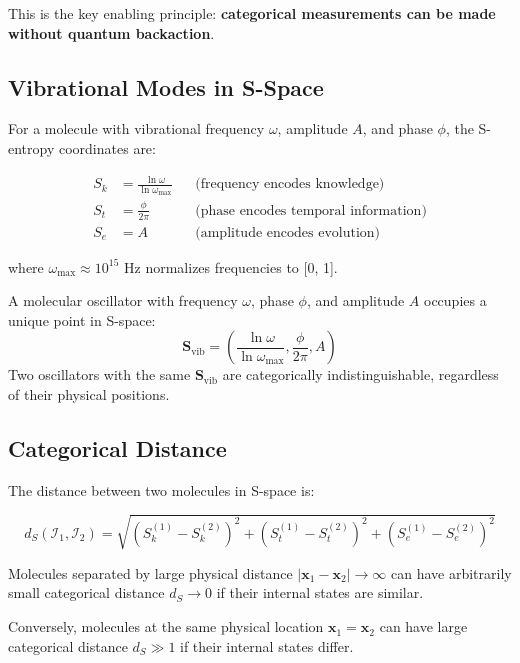 This is the key enabling principle: \textbf{categorical measurements can be made without quantum backaction}.

\subsection{Vibrational Modes in S-Space}

For a molecule with vibrational frequency $\omega$, amplitude $A$, and phase $\phi$, the S-entropy coordinates are:

\begin{align}
S_k &= \frac{\ln \omega}{\ln \omega_{\max}} && \text{(frequency encodes knowledge)} \\
S_t &= \frac{\phi}{2\pi} && \text{(phase encodes temporal information)} \\
S_e &= A && \text{(amplitude encodes evolution)}
\end{align}

where $\omega_{\max} \approx 10^{15}$ Hz normalizes frequencies to [0, 1].

\begin{proposition}
A molecular oscillator with frequency $\omega$, phase $\phi$, and amplitude $A$ occupies a unique point in S-space:
\begin{equation}
\mathbf{S}_{\text{vib}} = \left(\frac{\ln \omega}{\ln \omega_{\max}}, \frac{\phi}{2\pi}, A\right)
\end{equation}
Two oscillators with the same $\mathbf{S}_{\text{vib}}$ are categorically indistinguishable, regardless of their physical positions.
\end{proposition}

\subsection{Categorical Distance}

The distance between two molecules in S-space is:

\begin{equation}
d_S(\mathscr{I}_1, \mathscr{I}_2) = \sqrt{(S_k^{(1)} - S_k^{(2)})^2 + (S_t^{(1)} - S_t^{(2)})^2 + (S_e^{(1)} - S_e^{(2)})^2}
\end{equation}

\begin{theorem}
Molecules separated by large physical distance $|\mathbf{x}_1 - \mathbf{x}_2| \to \infty$ can have arbitrarily small categorical distance $d_S \to 0$ if their internal states are similar.

Conversely, molecules at the same physical location $\mathbf{x}_1 = \mathbf{x}_2$ can have large categorical distance $d_S \gg 1$ if their internal states differ.
\end{theorem}


